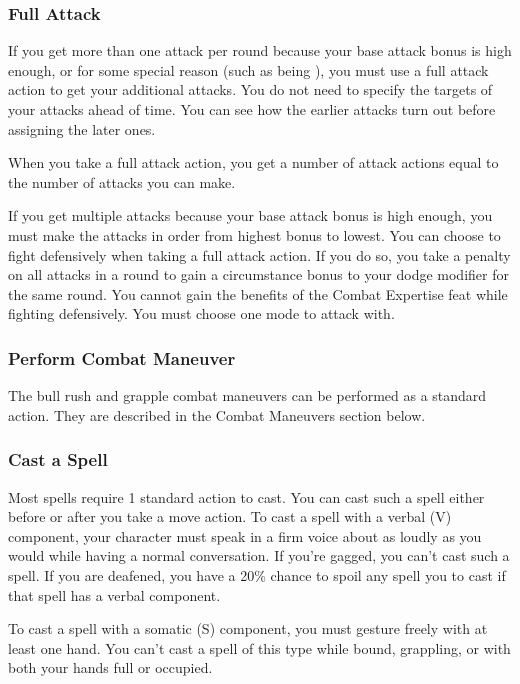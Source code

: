 \subsubsection{Full Attack}
If you get more than one attack per round because your base attack bonus is high enough, or for some special reason (such as being ), you must use a full attack action to get your additional attacks. You do not need to specify the targets of your attacks ahead of time. You can see how the earlier attacks turn out before assigning the later ones.
\par When you take a full attack action, you get a number of attack actions equal to the number of attacks you can make.
\par If you get multiple attacks because your base attack bonus is high enough, you must make the attacks in order from highest bonus to lowest.
 You can choose to fight defensively when taking a full attack action. If you do so, you take a  penalty on all attacks in a round to gain a  circumstance bonus to your dodge modifier for the same round. You cannot gain the benefits of the Combat Expertise feat while fighting defensively. You must choose one mode to attack with.

\subsubsection{Perform Combat Maneuver}
The bull rush and grapple combat maneuvers can be performed as a standard action. They are described in the Combat Maneuvers section below.

\subsubsection{Cast a Spell}
Most spells require 1 standard action to cast. You can cast such a spell either before or after you take a move action.
 To cast a spell with a verbal (V) component,
your character must speak in a firm voice about as loudly as you would while having a normal conversation. If you're gagged, you can't cast such a spell. If you are deafened, you have a 20\% chance to spoil any spell you to cast if that spell has a verbal component.

To cast a spell with a somatic (S) component, you must gesture freely with at least one hand. You can't cast a spell of this type while bound, grappling, or with both your hands full or occupied.

